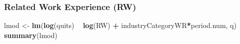 \documentclass[
]{article}
\newenvironment{Shaded}{\begin{snugshade}}{\end{snugshade}}
\newcommand{\KeywordTok}[1]{\textcolor[rgb]{0.13,0.29,0.53}{\textbf{#1}}}
\newcommand{\NormalTok}[1]{#1}
\newcommand{\OperatorTok}[1]{\textcolor[rgb]{0.81,0.36,0.00}{\textbf{#1}}}
\newcommand{\StringTok}[1]{\textcolor[rgb]{0.31,0.60,0.02}{#1}}
\begin{document}
\hypertarget{related-work-experience-rw}{%
\subsubsection{Related Work Experience
(RW)}\label{related-work-experience-rw}}

\begin{Shaded}
\begin{Highlighting}[]
\NormalTok{lmod <-}\StringTok{ }\KeywordTok{lm}\NormalTok{(}\KeywordTok{log}\NormalTok{(quits) }\OperatorTok{~}\StringTok{ }\KeywordTok{log}\NormalTok{(RW) }\OperatorTok{+}\StringTok{ }\NormalTok{industryCategoryWR}\OperatorTok{*}\NormalTok{period.num, q)}
\KeywordTok{summary}\NormalTok{(lmod)}
\end{Highlighting}
\end{Shaded}
\end{document}
